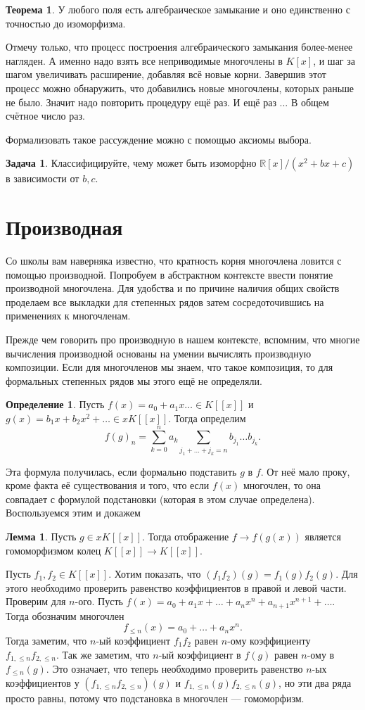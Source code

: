 \documentclass[10pt,a4paper,oneside]{book}
\theoremstyle{definition}
\newtheorem{zad}{Задача}
\newtheorem{defn}{Определение}
\newtheorem{thm}{Теорема}
\newtheorem{lem}{Лемма}
\newcommand{\mb}[1]{\mathbb{#1}}
\def\thrm{\begin{thm}}
\def\ethrm{\end{thm}}
\def\dfn{\begin{defn}}
\def\edfn{\end{defn}}
\def\lm{\begin{lem}}
\def\elm{\end{lem}}
\def\zd{\begin{zad}}
\def\ezd{\end{zad}}
\begin{document}
\thrm У любого поля есть алгебраическое замыкание и оно единственно с точностью до изоморфизма.
\ethrm
{} Отмечу только, что процесс построения алгебраического замыкания более-менее нагляден. А именно надо взять все неприводимые многочлены в $K[x]$, и шаг за шагом увеличивать расширение, добавляя всё новые корни. Завершив этот процесс можно обнаружить, что добавились новые многочлены, которых раньше не было. Значит надо повторить процедуру ещё раз. И ещё раз ... В общем счётное число раз.

Формализовать такое рассуждение можно с помощью аксиомы выбора. 
\endproof

\zd Классифицируйте, чему может быть изоморфно $\mb R[x]/(x^2 + bx +c)$ в зависимости от $b,c$.
\ezd












\section{Производная}
Со школы вам наверняка известно, что кратность корня многочлена ловится с помощью производной. Попробуем в абстрактном
контексте ввести понятие производной многочлена. Для удобства и по причине наличия общих свойств проделаем все выкладки для степенных рядов затем сосредоточившись на применениях к многочленам.


Прежде чем говорить про производную в нашем контексте, вспомним, что многие вычисления производной основаны на умении вычислять производную композиции. Если для многочленов мы знаем, что такое композиция, то для формальных степенных рядов мы этого ещё не определяли.

\dfn Пусть $f(x)=a_0+ a_1x\dots\in K[[x]]$ и $g(x)= b_1x+b_2x^2+\dots \in xK[[x]]$. Тогда определим 
$$f(g)_n= \sum_{k=0}^n a_k\sum_{j_1+\dots+j_k=n} b_{j_1}\dots b_{j_k}.$$
\edfn

Эта формула получилась, если формально подставить $g$ в $f$. От неё мало проку, кроме факта её существования и того, что если $f(x)$ многочлен, то она совпадает с формулой подстановки (которая в этом случае определена). Воспользуемся этим и докажем

\lm Пусть $g\in xK[[x]]$. Тогда отображение $f \to f(g(x))$ является гомоморфизмом колец $K[[x]]\to K[[x]]$.
\elm
\proof Пусть $f_1, f_2 \in K[[x]]$. Хотим показать, что $(f_1f_2)(g)=f_1(g)f_2(g)$. Для этого необходимо проверить равенство коэффициентов в правой и левой части. Проверим для $n$-ого. Пусть $f(x)= a_0+a_1x+\dots+a_nx^n+a_{n+1}x^{n+1}+\dots$. Тогда обозначим многочлен 
$$f_{\leq n}(x)=a_0+\dots+a_nx^n.$$
Тогда заметим, что $n$-ый коэффициент $f_1f_2$ равен $n$-ому коэффициенту $f_{1,\leq n}f_{2,\leq n}$. Так же заметим, что $n$-ый коэффициент в $f(g)$ равен $n$-ому в $f_{\leq n}(g)$. Это означает, что теперь необходимо проверить равенство $n$-ых коэффициентов у $(f_{1,\leq n}f_{2,\leq n})(g)$ и $f_{1,\leq n}(g)f_{2,\leq n}(g)$, но эти два ряда просто равны, потому что подстановка в многочлен --- гомоморфизм. \endproof 
\end{document}
